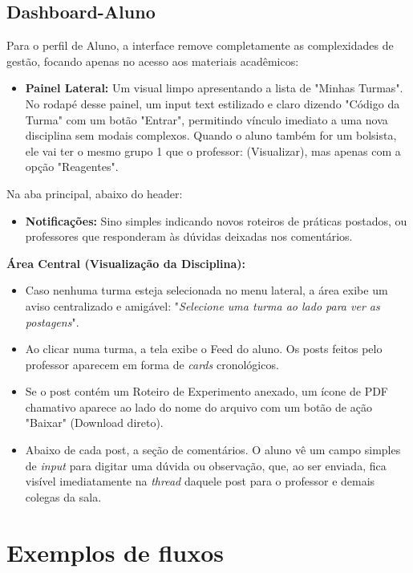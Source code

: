 \documentclass[12pt,a4paper]{article}
\begin{document}
\subsection{Dashboard-Aluno}
Para o perfil de Aluno, a interface remove completamente as complexidades de gestão, focando apenas no acesso aos materiais acadêmicos:
\begin{itemize}
    \item \textbf{Painel Lateral:} Um visual limpo apresentando a lista de "Minhas Turmas". No rodapé desse painel, um input text estilizado e claro dizendo "Código da Turma" com um botão "Entrar", permitindo vínculo imediato a uma nova disciplina sem modais complexos. Quando o aluno também for um bolsista, ele vai ter o mesmo grupo 1 que o professor: (Visualizar), mas apenas com a opção "Reagentes".
    
\end{itemize}
Na aba principal, abaixo do header:
\begin{itemize}
    \item \textbf{Notificações:} Sino simples indicando novos roteiros de práticas postados, ou professores que responderam às dúvidas deixadas nos comentários.
\end{itemize}
\textbf{Área Central (Visualização da Disciplina):}
\begin{itemize}
    \item Caso nenhuma turma esteja selecionada no menu lateral, a área exibe um aviso centralizado e amigável: "\textit{Selecione uma turma ao lado para ver as postagens}".
    \item Ao clicar numa turma, a tela exibe o Feed do aluno. Os posts feitos pelo professor aparecem em forma de \textit{cards} cronológicos.
    \item Se o post contém um Roteiro de Experimento anexado, um ícone de PDF chamativo aparece ao lado do nome do arquivo com um botão de ação "Baixar" (Download direto).
    \item Abaixo de cada post, a seção de comentários. O aluno vê um campo simples de \textit{input} para digitar uma dúvida ou observação, que, ao ser enviada, fica visível imediatamente na \textit{thread} daquele post para o professor e demais colegas da sala.
\end{itemize}

\newpage

\section{Exemplos de fluxos}
\end{document}
